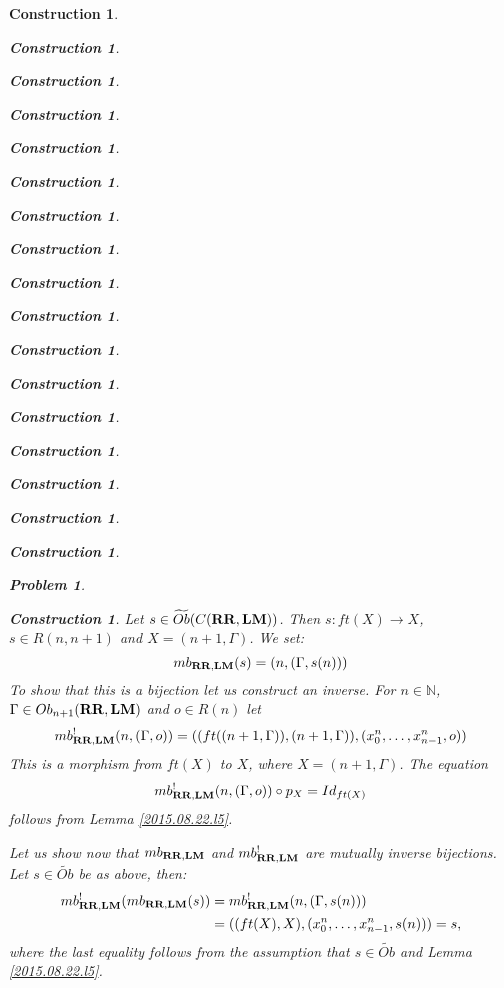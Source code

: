 \documentclass[12pt]{amsart}
\numberwithin{proposition}{subsection}
\newtheorem{problem}[proposition]{Problem}
\newtheorem{construction}[proposition]{Construction}
\newcommand{\llabel}[1]{\label{#1}}
\newcommand{\sr}{\rightarrow}
\newcommand{\nn}{{\mathbb N}}
\newcommand{\nat}{\nn}
\newcommand{\wt}{\widetilde}
\newcommand{\RR}{{\bf RR}}
\newcommand{\LM}{{\bf LM}}
\begin{document}
\begin{construction}
\begin{construction}
\begin{construction}
\begin{construction}
\begin{construction}
\begin{construction}
\begin{construction}
\begin{construction}
\begin{construction}
\begin{construction}
\begin{construction}
\begin{construction}
\begin{construction}
\begin{construction}
\begin{construction}
\begin{construction}
\begin{construction}
\begin{problem}
\begin{equation}
\end{equation}%
%
\end{problem}
%
\begin{construction}\rm
\llabel{2015.08.22.constr1}
\llabel{2014.06.30.l2}
Let $s\in \wt{Ob}(C(\RR,\LM))$. Then $s:ft(X)\sr X$, $s\in R(n,n+1)$ and $X=(n+1,\Gamma)$. We set:
%
$$mb_{\RR,\LM}(s)=(n,(\Gamma, s(n)))$$
%
To show that this is a bijection let us construct an inverse. For $n\in\nat$, $\Gamma\in Ob_{n+1}(\RR,\LM)$ and $o\in R(n)$ let
%
$$mb_{\RR,\LM}^!(n,(\Gamma,o))=((ft((n+1,\Gamma)),(n+1,\Gamma)),(x^{n}_0,\dots,x^{n}_{n-1},o))$$
%
This is a morphism from $ft(X)$ to $X$, where $X=(n+1,\Gamma)$. The equation
$$mb_{\RR,\LM}^!(n,(\Gamma,o))\circ p_X=Id_{ft(X)}$$ follows from Lemma
\ref{2015.08.22.l5}.

Let us show now that $mb_{\RR,\LM}$ and $mb_{\RR,\LM}^!$ are mutually inverse bijections. Let $s\in \wt{Ob}$ be as above, then:
\begin{equation*}
  \begin{split}
    mb_{\RR,\LM}^!(mb_{\RR,\LM}(s))&=mb_{\RR,\LM}^!(n,(\Gamma,s(n)))\\
    &=((ft(X),X),(x^{n}_0,\dots,x^{n}_{n-1},s(n)))=s,
  \end{split}
\end{equation*}
where the last equality follows from the assumption that $s\in \wt{Ob}$ and Lemma \ref{2015.08.22.l5}.


\end{construction}
\end{construction}
\end{construction}
\end{construction}
\end{construction}
\end{construction}
\end{construction}
\end{construction}
\end{construction}
\end{construction}
\end{construction}
\end{construction}
\end{construction}
\end{construction}
\end{construction}
\end{construction}
\end{construction}
\end{construction}
\end{document}

